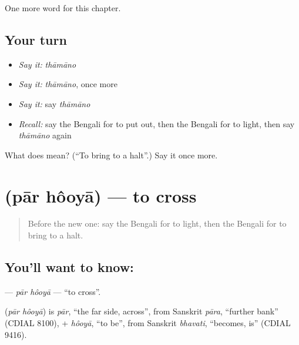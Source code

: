 \begin{grammarlens}[title={What you've built}]
One more word for this chapter.
\end{grammarlens}

\subsection*{Your turn}
\begin{itemize}
\raggedright
  \item \emph{Say it:} \emph{thāmāno}
  \item \emph{Say it:} \emph{thāmāno}, once more
  \item \emph{Say it:} say \emph{thāmāno}
  \item \emph{Recall:} say the Bengali for to put out, then the Bengali for to light, then say \emph{thāmāno} again
\end{itemize}

\begin{tcolorbox}[breakable,colback=teal!4,colframe=teal!35!black,title={Before you move on}]
What does  mean? (\textquotedblleft{}To bring to a halt\textquotedblright{}.) Say it once more.
\end{tcolorbox}
\section[\texorpdfstring{\bn{পার} \bn{হওয়া} (pār hôoyā)}{পার হওয়া (pār hôoyā)}]{  (pār hôoyā) — to cross}

\label{lesson:BN-C237-par-hooya}



\begin{quote}
Before the new one: say the Bengali for to light, then the Bengali for to bring to a halt.
\end{quote}

\subsection*{You'll want to know:  }
\textbf{ } — \emph{pār hôoyā} — \textquotedblleft{}to cross\textquotedblright{}.

\begin{cousinweb}
\textbf{ } (\emph{pār hôoyā}) is \emph{pār}, \textquotedblleft{}the far side, across\textquotedblright{}, from Sanskrit \emph{pāra}, \textquotedblleft{}further bank\textquotedblright{} (CDIAL 8100), + \emph{hôoyā}, \textquotedblleft{}to be\textquotedblright{}, from Sanskrit \emph{bhavati}, \textquotedblleft{}becomes, is\textquotedblright{} (CDIAL 9416).
\end{cousinweb}


